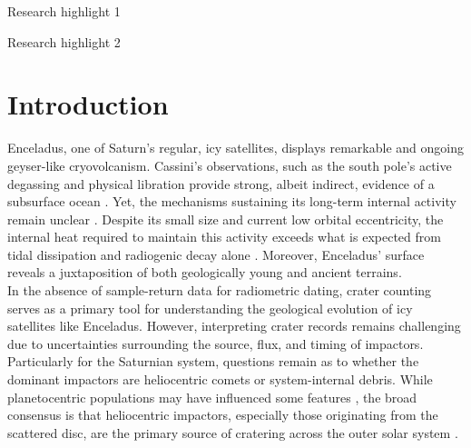 \documentclass[preprint,12pt,3p,times,authoryear]{elsarticle}
\begin{document}
\begin{frontmatter}
\begin{highlights}
\item Research highlight 1
\item Research highlight 2
\end{highlights}

\begin{keyword}



\end{keyword}

\end{frontmatter}


\linenumbers
\section{Introduction}
\label{intro}

Enceladus, one of Saturn's regular, icy satellites, displays remarkable and ongoing geyser-like cryovolcanism. Cassini’s observations, such as the south pole’s active degassing \citep{Porco2004,Spencer2006} and physical libration \citep{Thomas2016,Nimmo2023} provide strong, albeit indirect, evidence of a subsurface ocean \citep{Porco2004,Spencer2006}. Yet, the mechanisms sustaining its long-term internal activity remain unclear \citep{Nimmo2023}. Despite its small size and current low orbital eccentricity, the internal heat required to maintain this activity exceeds what is expected from tidal dissipation and radiogenic decay alone \citep{Meyer2007,Roberts2008}. Moreover, Enceladus' surface reveals a juxtaposition of both geologically young and ancient terrains.\\

In the absence of sample-return data for radiometric dating, crater counting serves as a primary tool for understanding the geological evolution of icy satellites like Enceladus. However, interpreting crater records remains challenging due to uncertainties surrounding the source, flux, and timing of impactors. Particularly for the Saturnian system, questions remain as to whether the dominant impactors are heliocentric comets or system-internal debris. While planetocentric populations may have influenced some features \citep{Ferguson2022}, the broad consensus is that heliocentric impactors, especially those originating from the scattered disc, are the primary source of cratering across the outer solar system \citep{Shoemaker1982,Chapman1986,Zahnle1998,Nesvorny2019,Wong2023,Nesvorny2023}. \\
\end{document}

